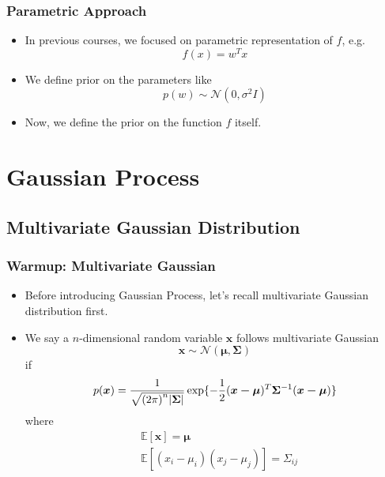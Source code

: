 \documentclass{beamer}
\begin{document}
\begin{frame}
	\frametitle{Parametric Approach}
	\begin{itemize}
		\item In previous courses, we focused on parametric representation of $f$, e.g.
		\[
			f(x)=w^Tx
		\]
		\item We define prior on the parameters like
		\[
			p(w) \sim \mathcal{N}(0, \sigma^2 I)
		\]
		\item Now, we define the prior on the function $f$ itself. 
	\end{itemize}	
\end{frame}

\section{Gaussian Process}
\subsection{Multivariate Gaussian Distribution}
\begin{frame}
	\frametitle{Warmup: Multivariate Gaussian}
	\begin{itemize}
		\item Before introducing Gaussian Process, let's recall multivariate Gaussian distribution first.
		\item We say a $n$-dimensional random variable $\mathbf{x}$ follows multivariate Gaussian 
			\[
				 \bm{x} \sim \mathcal{N}(\bm{\mu}, \bm{\Sigma})
			\]
			if
			\[
				p(\bm{x}) = \frac{1}{{\sqrt {{{(2\pi )}^n}{\rm{|}}\bm{\Sigma} {\rm{|}}} }}\exp \{  - \frac{1}{2}{(\bm{x-\mu})^T}{\bm{\Sigma} ^{ - 1}}({\bm{x - \mu}})\}
			\]
			where
			\begin{align*}
				& \mathbb{E}[\mathbf{x}] = \bm{\mu} \\
				& \mathbb{E}[(x_i-\mu_i)(x_j-\mu_j)] = \Sigma_{ij}
			\end{align*}
	\end{itemize}
\end{frame}
\end{document}
